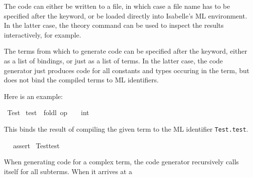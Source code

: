 \begin{isabellebody}
\begin{isamarkuptext}
  The code can either be written to a file, in which case a file name
  has to be specified after the \hyperlink{keyword.file}{\mbox{}} keyword, or be loaded
  directly into Isabelle's ML environment. In the latter case, the
  \hyperlink{command.ML}{\mbox{}} theory command can be used to inspect the results
  interactively, for example.

  The terms from which to generate code can be specified after the
  \hyperlink{keyword.contains}{\mbox{}} keyword, either as a list of bindings, or just
  as a list of terms. In the latter case, the code generator just
  produces code for all constants and types occuring in the term, but
  does not bind the compiled terms to ML identifiers.

  Here is an example:%
\end{isamarkuptext}%
\isamarkuptrue%
\isamarkupfalse%
\ Test\isanewline
{}\ test\ {}\ {}foldl\ op\ {}\ {}{}\ {}{}\ int{}\ {}{}{}\ {}{}\ {}{}\ {}{}\ {}{}{}%
\begin{isamarkuptext}%
\noindent This binds the result of compiling the given term to
  the ML identifier \verb|Test.test|.%
\end{isamarkuptext}%
\isamarkuptrue%
%
\isadelimML
%
\endisadelimML
%
\isatagML
{}\isamarkupfalse%
\ {}\ %
\isaantiq
assert{}%
\endisaantiq
\ {}Test{}test\ {}\ {}{}{}\ {}%
\endisatagML
{\isafoldML}%
%
\isadelimML
%
\endisadelimML
%
\isamarkuptrue%
%
\begin{isamarkuptext}%
When generating code for a complex term, the code generator
  recursively calls itself for all subterms.  When it arrives at a

\end{isamarkuptext}
\end{isabellebody}
